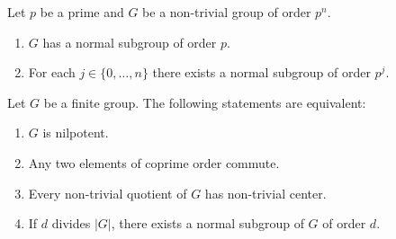 
\begin{exercise}
	\label{xca:pgrupos}
	Let $p$ be a prime and $G$ be a non-trivial group of order $p^n$.
	\begin{enumerate}
		\item $G$ has a normal subgroup of order $p$.
		\item For each $j\in\{0,\dots,n\}$ there exists a normal subgroup of order $p^j$. 
	\end{enumerate}
\end{exercise}


\begin{exercise}
\label{xca:nilpotente_equivalencia}
	Let $G$ be a finite group. The following statements are equivalent:
	\begin{enumerate}
		\item $G$ is nilpotent.
		\item Any two elements of coprime order commute. 
		\item Every non-trivial quotient of $G$ has non-trivial center.
		\item If $d$ divides $|G|$, there exists a normal subgroup of $G$ of order $d$. 
		\end{enumerate}
\end{exercise}

